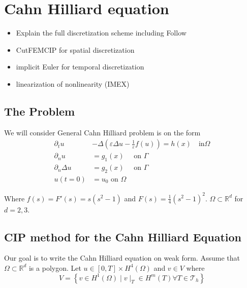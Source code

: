
\newpage
\section{Cahn Hilliard equation }%
\label{sec:cahn_hilliard_equation}


\begin{itemize}
    \item Explain the full discretization scheme including Follow \cite{feng2007fully}
    \item CutFEMCIP for spatial discretization
    \item implicit Euler for temporal discretization
    \item linearization of nonlinearity (IMEX)
\end{itemize}


\subsection{The Problem}%
\label{sub:the_problem}

We will consider General Cahn Hilliard problem is on the form
\begin{equation}
\label{eq:ch_exact}
    \begin{split}
        \partial _{t} u & - \Delta ( \varepsilon  \Delta u - \frac{1}{\varepsilon } f( u) ) =  h(x)  \quad \text{in} \Omega \\
        \partial _{n} u & =  g_{1}(x)  \quad \text{ on } \Gamma \\
        \partial _{n} \Delta u & = g_{2}(x)  \quad \text{ on } \Gamma  \\
        u(t=0) & = u_{0}   \text{ on } \Omega
    \end{split}
\end{equation}

Where $f( s)  = F' ( s)=s( s^2 -1)  $ and $F( s)  = \frac{1}{4} ( s^2 - 1)^2 $. $\Omega \subset \mathbb{R} ^{d} $  for $d = 2,3$.



\subsection{ CIP method for the Cahn Hilliard Equation}%
\label{sub:writing_the_cahn_hilliard_equation_of_weak_form}

Our goal is to write the Cahn Hilliard equation on weak form.
Assume that $\Omega  \subset \mathbb{R} ^{d}$ is a polygon.
 Let $u \in \left[ 0,T \right] \times H^{4}( \Omega ) $ and $v \in V$ where \[
V = \left\{ v \in H^{1}( \Omega )   \mid  v \mid _{T} \in H^{m}( T)  \forall T \in \mathcal{T} _{h} \right\}
\]

